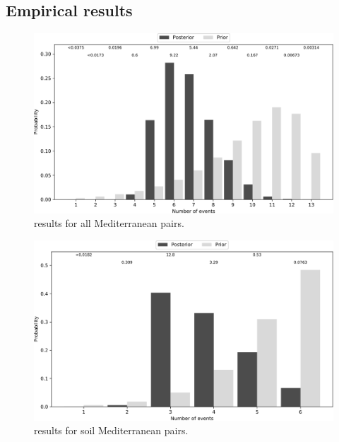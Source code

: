 \documentclass[letterpaper,12pt]{article}
\begin{document}
\newpage

\subsection{Empirical results}


\begin{figure}[htbp]
    \begin{center}
        \includegraphics[width=\textwidth,height=\textheight,keepaspectratio]{../images/from-project-repo/empirical-plots/mediterranean-all-pairs/pyco-sumevents-mediterranean-all-pairs-pycoevolity-nevents-cropped.pdf}
        \caption{
            \Ecoevolity results for all Mediterranean pairs.
        }
        \label{fig:neventsmediall}
    \end{center}
\end{figure}

\begin{figure}[htbp]
    \begin{center}
        \includegraphics[width=\textwidth,height=\textheight,keepaspectratio]{../images/from-project-repo/empirical-plots/mediterranean-soil-pairs/pyco-sumevents-mediterranean-soil-pairs-pycoevolity-nevents-cropped.pdf}
        \caption{
            \Ecoevolity results for soil Mediterranean pairs.
        }
        \label{fig:neventsmedisoil}
    \end{center}
\end{figure}
\end{document}
